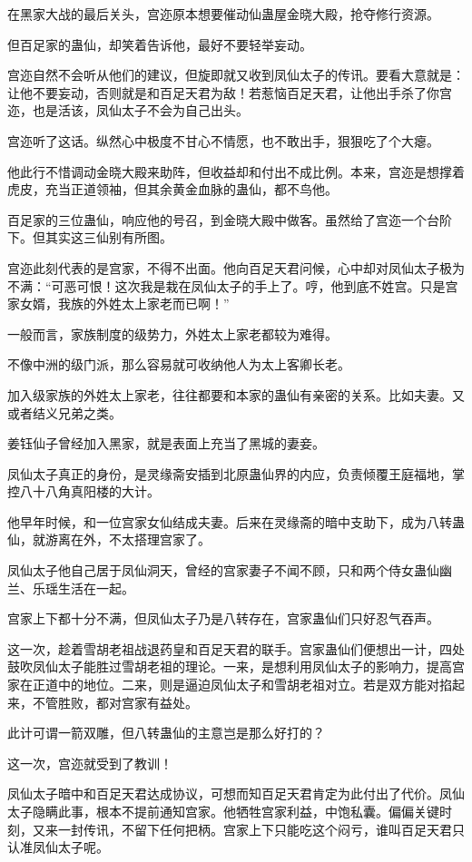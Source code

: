 \begin{this_body}
在黑家大战的最后关头，宫迩原本想要催动仙蛊屋金晓大殿，抢夺修行资源。

但百足家的蛊仙，却笑着告诉他，最好不要轻举妄动。

宫迩自然不会听从他们的建议，但旋即就又收到凤仙太子的传讯。要看大意就是：让他不要妄动，否则就是和百足天君为敌！若惹恼百足天君，让他出手杀了你宫迩，也是活该，凤仙太子不会为自己出头。

宫迩听了这话。纵然心中极度不甘心不情愿，也不敢出手，狠狠吃了个大瘪。

他此行不惜调动金晓大殿来助阵，但收益却和付出不成比例。本来，宫迩是想撑着虎皮，充当正道领袖，但其余黄金血脉的蛊仙，都不鸟他。

百足家的三位蛊仙，响应他的号召，到金晓大殿中做客。虽然给了宫迩一个台阶下。但其实这三仙别有所图。

宫迩此刻代表的是宫家，不得不出面。他向百足天君问候，心中却对凤仙太子极为不满：“可恶可恨！这次我是栽在凤仙太子的手上了。哼，他到底不姓宫。只是宫家女婿，我族的外姓太上家老而已啊！”

一般而言，家族制度的级势力，外姓太上家老都较为难得。

不像中洲的级门派，那么容易就可收纳他人为太上客卿长老。

加入级家族的外姓太上家老，往往都要和本家的蛊仙有亲密的关系。比如夫妻。又或者结义兄弟之类。

姜钰仙子曾经加入黑家，就是表面上充当了黑城的妻妾。

凤仙太子真正的身份，是灵缘斋安插到北原蛊仙界的内应，负责倾覆王庭福地，掌控八十八角真阳楼的大计。

他早年时候，和一位宫家女仙结成夫妻。后来在灵缘斋的暗中支助下，成为八转蛊仙，就游离在外，不太搭理宫家了。

凤仙太子他自己居于凤仙洞天，曾经的宫家妻子不闻不顾，只和两个侍女蛊仙幽兰、乐瑶生活在一起。

宫家上下都十分不满，但凤仙太子乃是八转存在，宫家蛊仙们只好忍气吞声。

这一次，趁着雪胡老祖战退药皇和百足天君的联手。宫家蛊仙们便想出一计，四处鼓吹凤仙太子能胜过雪胡老祖的理论。一来，是想利用凤仙太子的影响力，提高宫家在正道中的地位。二来，则是逼迫凤仙太子和雪胡老祖对立。若是双方能对掐起来，不管胜败，都对宫家有益处。

此计可谓一箭双雕，但八转蛊仙的主意岂是那么好打的？

这一次，宫迩就受到了教训！

凤仙太子暗中和百足天君达成协议，可想而知百足天君肯定为此付出了代价。凤仙太子隐瞒此事，根本不提前通知宫家。他牺牲宫家利益，中饱私囊。偏偏关键时刻，又来一封传讯，不留下任何把柄。宫家上下只能吃这个闷亏，谁叫百足天君只认准凤仙太子呢。


\end{this_body}
